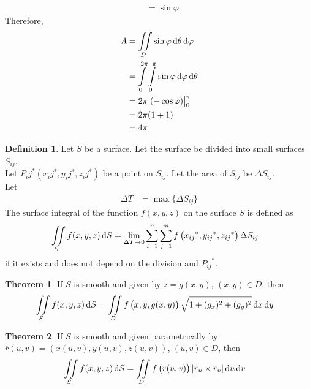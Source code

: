 \documentclass[fleqn, a4paper, 12pt, twoside]{article}
\theoremstyle{definition}
\newtheorem{definition}{Definition}
\theoremstyle{theorem}
\newtheorem{theorem}{Theorem}
\begin{document}
{\begin{solution}
\begin{align*}
                                                                                   & = \sin \varphi
	\end{align*}
	Therefore,
	\begin{align*}
		A &= \iint\limits_{D} \sin \varphi \dif \theta \dif \varphi\\
		&= \int\limits_{0}^{2 \pi} \int\limits_{0}^{\pi} \sin \varphi \dif \varphi \dif \theta\\
		&= 2 \pi \left. (-\cos \varphi) \right|_{0}^{\pi}\\
		&= 2 \pi (1 + 1)\\
		&= 4 \pi
	\end{align*}
\end{solution}

\begin{definition}
	Let $S$ be a surface.
	Let the surface be divided into small surfaces $S_{i j}$.\\
	Let ${P_i j}^*\left( {x_i j}^* , {y_i j}^* , {z_i j}^* \right)$ be a point on $S_{i j}$.
	Let the area of $S_{i j}$ be $\Delta S_{i j}$.\\
	Let
	\begin{align*}
		\Delta T &= \max\{\Delta S_{i j}\}
	\end{align*}
	The surface integral of the function $f(x,y,z)$ on the surface $S$ is defined as
	\begin{align*}
		\iint\limits_{S} f(x,y,z) \dif S &= \lim\limits_{\Delta T \to 0} \sum\limits_{i = 1}^{n} \sum\limits_{j = 1}^{m} f\left( {x_{i j}}^* , {y_{i j}}^* , {z_{i j}}^* \right) \Delta S_{i j}
	\end{align*}
	if it exists and does not depend on the division and ${P_{i j}}^*$.
\end{definition}

\begin{theorem}
	If $S$ is smooth and given by $z = g(x,y)$, $(x,y) \in D$, then
	\begin{align*}
		\iint\limits_{S} f(x,y,z) \dif S &= \iint\limits_{D} f\left( x , y , g(x,y) \right) \sqrt{1 + (g_x)^2 + (g_y)^2} \dif x \dif y
	\end{align*}
\end{theorem}
\begin{theorem}
	If $S$ is smooth and given parametrically by $\overline{r}(u,v) = \left( x(u,v) , y(u,v) , z(u,v) \right)$, $(u,v) \in D$, then
	\begin{align*}
		\iint\limits_{S} f(x,y,z) \dif S &= \iint\limits_{D} f\left( \overline{r}(u,v) \right) \left| \overline{r}_u \times \overline{r}_v \right| \dif u \dif v
	\end{align*}
\end{theorem}

}
\end{document}
